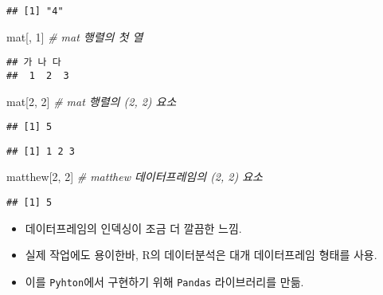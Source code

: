 \documentclass[
  12,
]{article}
\newenvironment{Shaded}{\begin{snugshade}}{\end{snugshade}}
\newcommand{\CommentTok}[1]{\textcolor[rgb]{0.56,0.35,0.01}{\textit{#1}}}
\newcommand{\DecValTok}[1]{\textcolor[rgb]{0.00,0.00,0.81}{#1}}
\newcommand{\NormalTok}[1]{#1}
\newcommand{\SpecialCharTok}[1]{\textcolor[rgb]{0.00,0.00,0.00}{#1}}
\begin{document}
\begin{verbatim}
## [1] "4"
\end{verbatim}

\begin{Shaded}
\begin{Highlighting}[]
\NormalTok{mat[, }\DecValTok{1}\NormalTok{] }\CommentTok{\# mat 행렬의 첫 열}
\end{Highlighting}
\end{Shaded}

\begin{verbatim}
## 가 나 다 
##  1  2  3
\end{verbatim}

\begin{Shaded}
\begin{Highlighting}[]
\NormalTok{mat[}\DecValTok{2}\NormalTok{, }\DecValTok{2}\NormalTok{] }\CommentTok{\# mat 행렬의 (2, 2) 요소}
\end{Highlighting}
\end{Shaded}

\begin{verbatim}
## [1] 5
\end{verbatim}

\begin{Shaded}
\end{Shaded}

\begin{verbatim}
## [1] 1 2 3
\end{verbatim}

\begin{Shaded}
\begin{Highlighting}[]
\NormalTok{matthew[}\DecValTok{2}\NormalTok{, }\DecValTok{2}\NormalTok{] }\CommentTok{\# matthew 데이터프레임의 (2, 2) 요소}
\end{Highlighting}
\end{Shaded}

\begin{verbatim}
## [1] 5
\end{verbatim}

\begin{itemize}
\item
  데이터프레임의 인덱싱이 조금 더 깔끔한 느낌.
\item
  실제 작업에도 용이한바, R의 데이터분석은 대개 데이터프레임 형태를
  사용.
\item
  이를 \texttt{Pyhton}에서 구현하기 위해 \texttt{Pandas} 라이브러리를
  만듦.
\end{itemize}
\end{document}
